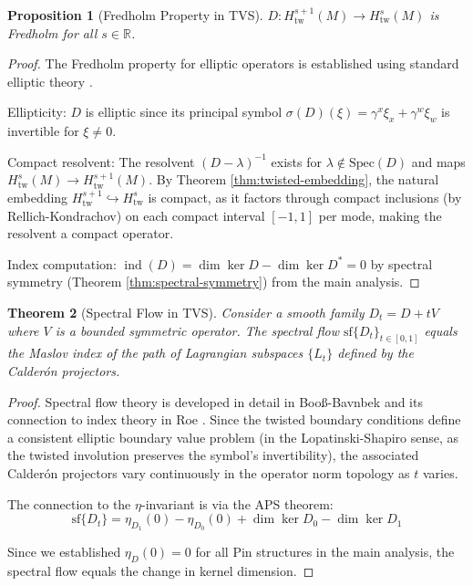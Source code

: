 \documentclass[11pt]{amsart}
\newtheorem{theorem}{Theorem}[section]
\newtheorem{proposition}[theorem]{Proposition}
\theoremstyle{definition}
\theoremstyle{remark}
\newcommand{\RR}{\mathbb{R}}
\DeclareMathOperator{\ind}{ind}
\begin{document}
\begin{proposition}[Fredholm Property in TVS]\label{prop:fredholm-tvs}
$D: H^{s+1}_{\mathrm{tw}}(M) \to H^s_{\mathrm{tw}}(M)$ is Fredholm for all $s \in \RR$.
\end{proposition}

\begin{proof}
The Fredholm property for elliptic operators is established using standard elliptic theory \cite{Hormander1985,SeeleySinger1988}.

Ellipticity: $D$ is elliptic since its principal symbol $\sigma(D)(\xi) = \gamma^x\xi_x + \gamma^w\xi_w$ is invertible for $\xi \neq 0$.

Compact resolvent: The resolvent $(D - \lambda)^{-1}$ exists for $\lambda \notin \mathrm{Spec}(D)$ and maps $H^s_{\mathrm{tw}}(M) \to H^{s+1}_{\mathrm{tw}}(M)$. By Theorem \ref{thm:twisted-embedding}, the natural embedding $H^{s+1}_{\mathrm{tw}} \hookrightarrow H^s_{\mathrm{tw}}$ is compact, as it factors through compact inclusions (by Rellich-Kondrachov) on each compact interval $[-1,1]$ per mode, making the resolvent a compact operator.

Index computation: $\ind(D) = \dim \ker D - \dim \ker D^* = 0$ by spectral symmetry (Theorem \ref{thm:spectral-symmetry}) from the main analysis.
\end{proof}

\begin{theorem}[Spectral Flow in TVS]\label{thm:spectral-flow-tvs}
Consider a smooth family $D_t = D + tV$ where $V$ is a bounded symmetric operator. The spectral flow $\mathrm{sf}\{D_t\}_{t \in [0,1]}$ equals the Maslov index of the path of Lagrangian subspaces $\{L_t\}$ defined by the Calderón projectors.
\end{theorem}

\begin{proof}
Spectral flow theory is developed in detail in Booß-Bavnbek \cite{BooßBleecker1985} and its connection to index theory in Roe \cite{Roe1998}. Since the twisted boundary conditions define a consistent elliptic boundary value problem (in the Lopatinski-Shapiro sense, as the twisted involution preserves the symbol's invertibility), the associated Calderón projectors vary continuously in the operator norm topology as $t$ varies.

The connection to the $\eta$-invariant is via the APS theorem:
\[
\mathrm{sf}\{D_t\} = \eta_{D_1}(0) - \eta_{D_0}(0) + \dim \ker D_0 - \dim \ker D_1
\]

Since we established $\eta_D(0) = 0$ for all Pin structures in the main analysis, the spectral flow equals the change in kernel dimension.
\end{proof}
\end{document}
